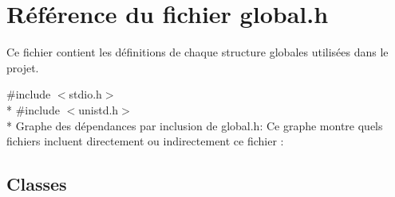 \hypertarget{a00021}{}\section{Référence du fichier global.\+h}
\label{a00021}


Ce fichier contient les définitions de chaque structure globales utilisées dans le projet.  


{\ttfamily \#include $<$stdio.\+h$>$}\\*
{\ttfamily \#include $<$unistd.\+h$>$}\\*
Graphe des dépendances par inclusion de global.\+h\+:
Ce graphe montre quels fichiers incluent directement ou indirectement ce fichier \+:
\subsection*{Classes}
